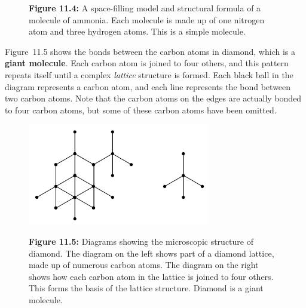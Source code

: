 \begin{enumerate}[noitemsep, label=\textbf{\arabic*}. ]
\begin{itemize}[noitemsep]
\begin{figure}[H]
\begin{center}
      \vspace{2pt}
    \vspace{\rubberspace}\par \begin{cnxcaption}
	  \small \textbf{Figure 11.4: }A space-filling model and structural 
formula of a molecule of ammonia. Each molecule is made up of one nitrogen atom 
and three hydrogen atoms. This is a simple molecule.
	\end{cnxcaption}
    \vspace{.1in}
    \end{center}
 \end{figure}       \end{itemize}
Figure~11.5 shows the bonds between the carbon atoms in diamond, 
which is a \textbf{giant molecule}. Each carbon atom 
is joined to four others, and this pattern repeats itself until a complex 
\textsl{lattice} structure is formed. Each black 
ball in the diagram represents a carbon atom, and each line represents the bond 
between two carbon atoms. Note that the carbon atoms on the edges are actually 
bonded to four carbon atoms, but some of these carbon atoms have been omitted.
    \setcounter{subfigure}{0}
	\begin{figure}[H] %
    \begin{center}
    \label{m38120*uid10!!!underscore!!!media}\label{m38120*uid10!!!underscore!!!printimage}\includegraphics[width=300px]{col11305.imgs/m38120_CG10C2_005.png} %
      \vspace{2pt}
    \vspace{\rubberspace}\par \begin{cnxcaption}
	  \small \textbf{Figure 11.5: }Diagrams showing the microscopic 
structure of diamond. The diagram on the left shows part of a diamond lattice, 
made up of numerous carbon atoms. The diagram on the right shows how each carbon 
atom in the lattice is joined to four others. This forms the basis of the 
lattice structure. Diamond is a giant molecule.
	\end{cnxcaption}
    \vspace{.1in}
    \end{center}
 \end{figure}       \end{enumerate}

